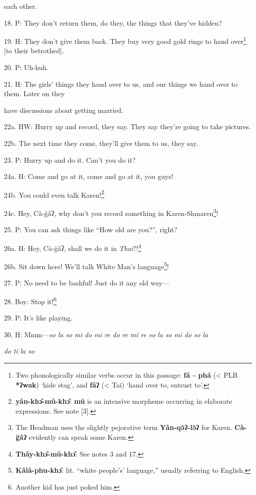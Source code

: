 each other.

18. P: They don't return them, do they, the things that they've hidden?

19. H: They don't give them back. They buy very good gold rings to hand over\footnote{Two phonologically similar verbs occur in this passage: \textbf{fá} \textasciitilde{} \textbf{phá} (< PLB \textbf{*ʔwak}) `hide stag', and \textbf{fâʔ} (< Tai) `hand over to, entrust to'.}
[to their betrothed].

20. P: Uh-huh.

21. H: The girls' things they hand over to us, and our things we hand over to them.
Later on they

have discussions about getting married.

22a. HW: Hurry up and record, they say. They say they're going to take pictures.

22b. The next time they come, they'll give them to us, they say.

23. P: Hurry up and do it. Can't you do it?

24a. H: Come and go at it, come and go at it, you guys!

24b. You could even talk Karen!\footnote{\textbf{yân-khɔ̂-mû-khɔ̂}: \textbf{mû} is an intensive morpheme occurring in elaborate expressions. See note [3].}

24c. Hey, Cà-g̈âʔ, why don't you record something in Karen-Shmaren\footnote{The Headman uses the slightly pejorative term \textbf{Yân-qə̂ʔ-lə̂ʔ} for Karen. \textbf{Cà-g̈âʔ} evidently can speak some Karen.}!

25. P: You can ask things like ``How old are you?'', right?

26a. H: Hey, Cà-g̈âʔ, shall we do it in \textit{Thai}?!\footnote{\textbf{Thây-khɔ̂-mû-khɔ̂}: See notes 3 and 17.}

26b. Sit down here! We'll talk White Man's language\footnote{\textbf{Kâlâ-phu-khɔ̂}: lit. ``white people's' language,'' usually referring to English.}!


27. P: No need to be bashful! Just do it any old way---

28. Boy: Stop it!\footnote{Another kid has just poked him.}

29. P: It's like playing.

30. H:  Mmm---\textit{so la so mi do mi re do re mi re
so la so mi do so la}

\textit{do ti la so} \textit{\textbf{
}}

